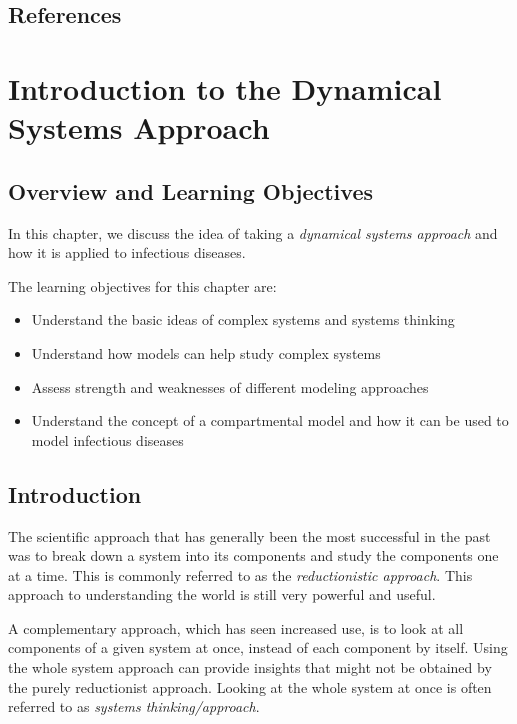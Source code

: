 \documentclass[]{book}
\providecommand{\tightlist}{%
  \setlength{\itemsep}{0pt}\setlength{\parskip}{0pt}}
\theoremstyle{definition}
\theoremstyle{definition}
\theoremstyle{definition}
\theoremstyle{remark}
\begin{document}
\section{References}\label{references}

\chapter{Introduction to the Dynamical Systems
Approach}\label{introduction-to-the-dynamical-systems-approach}

\section{Overview and Learning
Objectives}\label{overview-and-learning-objectives}

In this chapter, we discuss the idea of taking a \emph{dynamical systems
approach} and how it is applied to infectious diseases.

The learning objectives for this chapter are:

\begin{itemize}
\tightlist
\item
  Understand the basic ideas of complex systems and systems thinking
\item
  Understand how models can help study complex systems
\item
  Assess strength and weaknesses of different modeling approaches
\item
  Understand the concept of a compartmental model and how it can be used
  to model infectious diseases
\end{itemize}

\section{Introduction}\label{introduction}

The scientific approach that has generally been the most successful in
the past was to break down a system into its components and study the
components one at a time. This is commonly referred to as the
\emph{reductionistic approach}. This approach to understanding the world
is still very powerful and useful.

A complementary approach, which has seen increased use, is to look at
all components of a given system at once, instead of each component by
itself. Using the whole system approach can provide insights that might
not be obtained by the purely reductionist approach. Looking at the
whole system at once is often referred to as \emph{systems
thinking/approach}.
\end{document}
